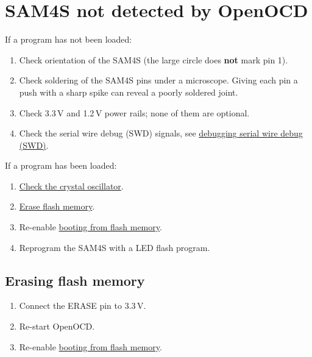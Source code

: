 \section{SAM4S not detected by OpenOCD}
\label{sam4s-not-detected-by-openocd}

If a program has not been loaded:

\begin{enumerate}
\item
  Check orientation of the SAM4S (the large circle does \textbf{not}
  mark pin 1).
\item
  Check soldering of the SAM4S pins under a microscope. Giving
  each pin a push with a sharp spike can reveal a poorly soldered joint.
\item
  Check 3.3\,V and 1.2\,V power rails; none of them are optional.
\item
  Check the serial wire debug (SWD) signals, see
  \protect\hyperref[debugging]{debugging serial wire debug (SWD)}.
\end{enumerate}

If a program has been loaded:

\begin{enumerate}
\item  \protect\hyperref[checking-the-crystal-oscillator]{Check the
    crystal oscillator}.

\item \hyperref[erasing-flash-memory]{Erase flash memory}.

\item Re-enable \hyperref[booting-from-flash-memory]{booting from flash
  memory}.

\item  Reprogram the SAM4S with a LED flash program.
\end{enumerate}


\subsection{Erasing flash memory}
\label{erasing-flash-memory}

\begin{enumerate}
\item Connect the ERASE pin to 3.3\,V.

\item Re-start OpenOCD.

\item Re-enable \hyperref[booting-from-flash-memory]{booting from
  flash memory}.
\end{enumerate}


